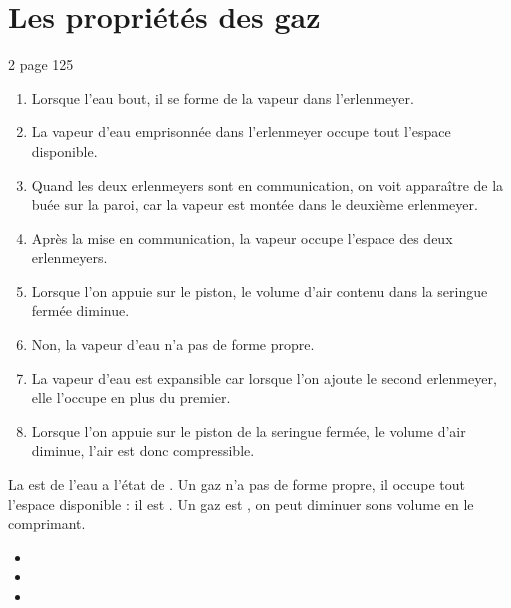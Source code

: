 \documentclass[12pt,a4paper]{article}
\begin{document}
\section{Les propriétés des gaz}

\begin{myact}{2 page 125}
	\begin{enumerate}
		\item Lorsque l'eau bout, il se forme de la vapeur dans l'erlenmeyer.
		\item La vapeur d'eau emprisonnée dans l'erlenmeyer occupe tout l'espace disponible.
		\item Quand les deux erlenmeyers sont en communication, on voit apparaître de la buée sur la paroi, car la vapeur est montée dans le deuxième erlenmeyer.
		\item Après la mise en communication, la vapeur occupe l'espace des deux erlenmeyers.
		\item Lorsque l'on appuie sur le piston, le volume d'air contenu dans la seringue fermée diminue.
		\item Non, la vapeur d'eau n'a pas de forme propre.
		\item La vapeur d'eau est expansible car lorsque l'on ajoute le second erlenmeyer, elle l'occupe en plus du premier.
		\item Lorsque l'on appuie sur le piston de la seringue fermée, le volume d'air diminue, l'air est donc compressible.
	\end{enumerate}
\end{myact}

\begin{mybilan}
La  est de l'eau a l'état de . Un gaz n'a pas de forme propre, il occupe tout l'espace disponible : il est . Un gaz est , on peut diminuer sons volume en le comprimant.	
\end{mybilan}


\begin{myexos}
	\begin{multicols}{2}
	
		\begin{itemize}
			\item {}
			\item {}
			\item {}
		\end{itemize}
	
	\end{multicols}
\end{myexos}
\end{document}
